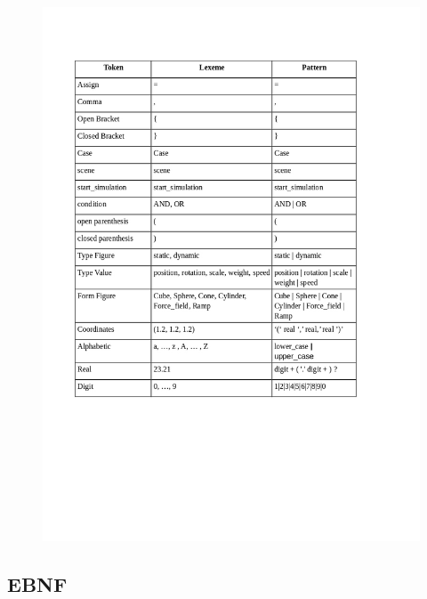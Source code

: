 \documentclass[12pt]{article}
\begin{document}
\begin{figure}[H] %
\centering
\includegraphics[width=\linewidth]{TablaTokens.jpg}
\end{figure}

\subsection{EBNF}
\end{document}
